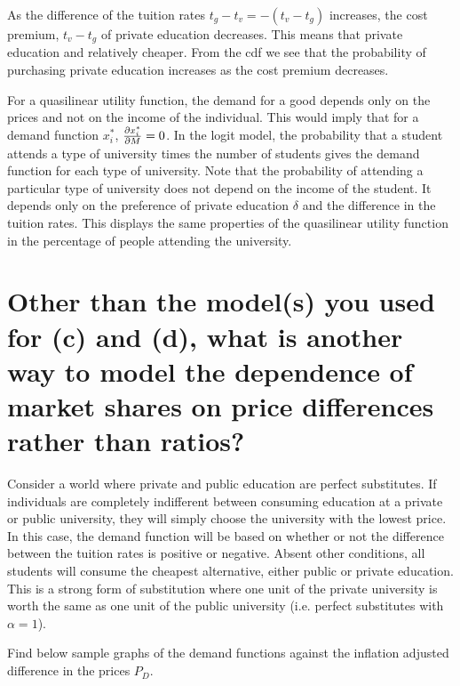 \documentclass[12pt]{paper}
\begin{document}
As the difference of the tuition rates
$t_g - t_v = - (t_v - t_g)$ increases, the cost premium, $t_v - t_g$
of private education decreases. This means that private education and
relatively cheaper. From the cdf we see that the probability of
purchasing private education increases as the cost premium decreases.

For a quasilinear utility function, the demand for a good depends only
on the prices and not on the income of the individual. This would
imply that for a demand function $x_i^{*}$, $\frac{ \partial x_i^{*}}{ \partial M} =
0$. In the logit model, the probability that a student attends a
type of university times the number of students gives the demand
function for each type of university. Note that the probability of
attending a particular type of university does not depend on the
income of the student. It depends only on the preference of private
education $\delta$ and the difference in the tuition rates. This displays
the same properties of the quasilinear utility function in the
percentage of people attending the university.



\section{Other than the model(s) you used for (c) and (d), what is
  another way to model the dependence of market shares on price differences rather than ratios?}

Consider a world where private and public education are perfect
substitutes. If individuals are completely indifferent between
consuming education at a private or public university, they will
simply choose the university with the lowest price. In this case, the
demand function will be based on whether or not the difference between
the tuition rates is positive or negative. Absent other conditions,
all students will consume the cheapest alternative, either public or
private education. This is a strong form of substitution where one
unit of the private university is worth the same as one unit of the
public university (i.e. perfect substitutes with $\alpha = 1$).

Find below sample graphs of the demand functions against the inflation
adjusted difference in the prices $P_D$. 
\end{document}
